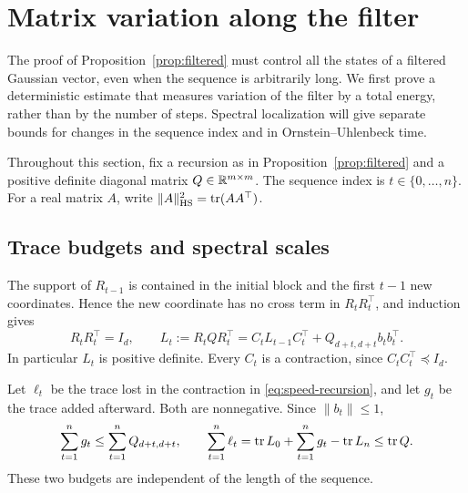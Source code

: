 \section{Matrix variation along the filter}
\label{sec:matrix}

The proof of Proposition~\ref{prop:filtered} must control all the states
of a filtered Gaussian vector, even when the sequence is arbitrarily
long.  We first prove a deterministic estimate that measures variation
of the filter by a total energy, rather than by the number of steps.
Spectral localization will give separate bounds for changes in the
sequence index and in Ornstein--Uhlenbeck time.

Throughout this section, fix a recursion as in
Proposition~\ref{prop:filtered} and a positive definite diagonal matrix
$Q\in\mathbb R^{m\times m}$.  The sequence index is $t\in\{0,\ldots,n\}$.
For a real matrix $A$, write
$\lVert A\rVert_{\mathrm{HS}}^2=\operatorname{tr}(AA^\top)$.

\subsection{Trace budgets and spectral scales}

The support of $R_{t-1}$ is contained in the initial block and the first
$t-1$ new coordinates.  Hence the new coordinate has no cross term in
$R_tR_t^\top$, and induction gives
\begin{equation}
 R_tR_t^\top=I_d,
 \qquad
 L_t:=R_tQR_t^\top
   =C_tL_{t-1}C_t^\top+Q_{d+t,d+t}b_tb_t^\top.
 \label{eq:speed-recursion}
\end{equation}
In particular $L_t$ is positive definite.  Every $C_t$ is a contraction,
since $C_tC_t^\top\preceq I_d$.

Let $\ell_t$ be the trace lost in the contraction in
\eqref{eq:speed-recursion}, and let $g_t$ be the trace added afterward.
Both are nonnegative.  Since $\lVert b_t\rVert\le1$,
\begin{equation}
 \sum_{t=1}^n g_t\le\sum_{t=1}^n Q_{d+t,d+t},
 \qquad
 \sum_{t=1}^n\ell_t
   =\operatorname{tr} L_0+\sum_{t=1}^n g_t-\operatorname{tr} L_n
   \le\operatorname{tr} Q.
 \label{eq:trace-budgets}
\end{equation}
These two budgets are independent of the length of the sequence.

